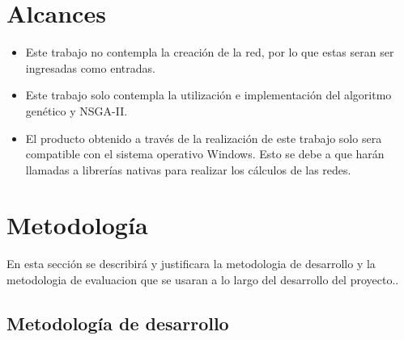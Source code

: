 \documentclass[11pt,letterpaper]{article}
\begin{document}
\section{Alcances}
\begin{itemize}
\item Este trabajo no contempla la creación de la red, por lo que estas seran ser ingresadas como entradas.
\item Este trabajo solo contempla la utilización e implementación del algoritmo genético y NSGA-II.
\item El producto obtenido a través de la realización de este trabajo solo sera compatible con el sistema operativo Windows. Esto se debe a que harán llamadas a librerías nativas para realizar los cálculos de las redes.

\end{itemize}



\section{Metodología}

En esta sección se describirá y justificara la metodologia de desarrollo y la metodologia de evaluacion que se usaran a lo largo del desarrollo del proyecto.. 
\subsection{Metodología de desarrollo}

\end{document}
